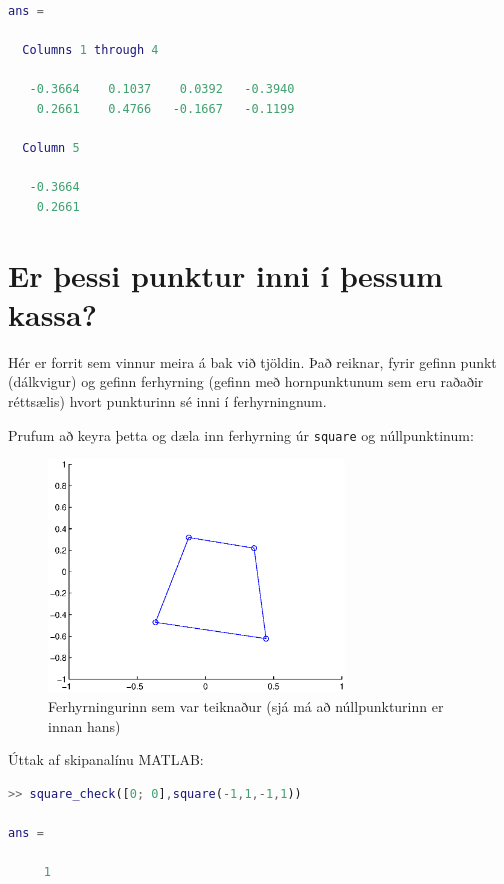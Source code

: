 \documentclass[a4]{article}
\begin{document}
\begin{flushright}
\begin{lstlisting}[language=Matlab]
ans =

  Columns 1 through 4

   -0.3664    0.1037    0.0392   -0.3940
    0.2661    0.4766   -0.1667   -0.1199

  Column 5

   -0.3664
    0.2661
\end{lstlisting}


\section{Er þessi punktur inni í þessum kassa?}

Hér er forrit sem vinnur meira á bak við tjöldin. Það reiknar, fyrir gefinn punkt (dálkvigur) og gefinn ferhyrning (gefinn með hornpunktunum sem eru raðaðir réttsælis) hvort punkturinn sé inni í ferhyrningnum.



Prufum að keyra þetta og dæla inn ferhyrning úr \lstinline{square} og núllpunktinum:

\begin{figure}[h!]
\centering
\includegraphics[width=0.7\textwidth]{sqchdaemi.eps}
\caption{Ferhyrningurinn sem var teiknaður (sjá má að núllpunkturinn er innan hans)}
\end{figure}

Úttak af skipanalínu MATLAB:

\begin{lstlisting}[language=Matlab]
>> square_check([0; 0],square(-1,1,-1,1))

ans =

     1
\end{lstlisting}


\end{flushright}
\end{document}
